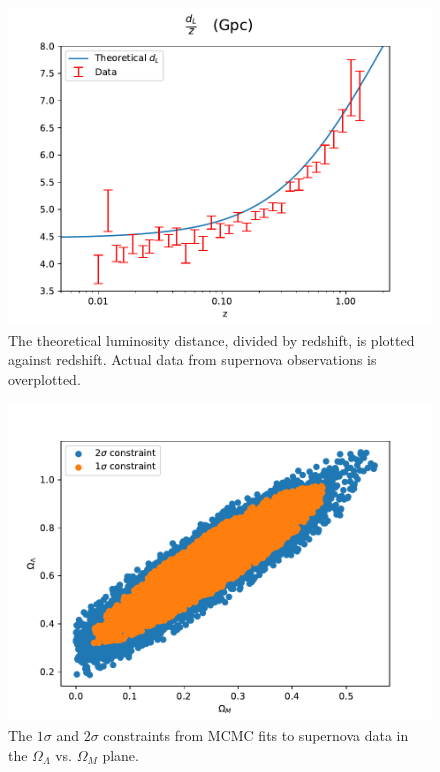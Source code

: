 \documentclass{aa}
\begin{document}
\begin{figure}[h!]
   \includegraphics[scale=0.6]{../figures/milestone1/dataplot.pdf}
   \caption{The theoretical luminosity distance, divided by redshift, is plotted against redshift. Actual data from supernova observations is overplotted.}\label{fig:M1_data}
\end{figure}

\begin{figure}[h!]
   \includegraphics[scale=0.6]{../figures/milestone1/constraints.pdf}
   \caption{The $1\sigma$ and $2\sigma$ constraints from MCMC fits to supernova data in the $\Omega_\Lambda$ vs. $\Omega_M$ plane.}\label{fig:M1_constraints}
\end{figure}
\end{document}
